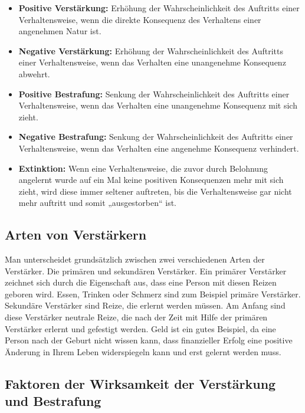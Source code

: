 		\begin{itemize}
			\item \textbf{Positive Verstärkung:} Erhöhung der Wahrscheinlichkeit des Auftritts einer Verhaltensweise, wenn die direkte Konsequenz des Verhaltens einer angenehmen Natur ist. 
			\item \textbf{Negative Verstärkung:} Erhöhung der Wahrscheinlichkeit des Auftritts einer Verhaltensweise, wenn das Verhalten eine unangenehme Konsequenz abwehrt.
			\item \textbf{Positive Bestrafung:} Senkung der Wahrscheinlichkeit des Auftritts einer Verhaltensweise, wenn das Verhalten eine unangenehme Konsequenz mit sich zieht.
			\item \textbf{Negative Bestrafung:} Senkung der Wahrscheinlichkeit des Auftritts einer Verhaltensweise, wenn das Verhalten eine angenehme Konsequenz verhindert. 
			\item \textbf{Extinktion:} Wenn eine Verhaltensweise, die zuvor durch Belohnung angelernt wurde auf ein Mal keine positiven Konsequenzen mehr mit sich zieht, wird diese immer seltener auftreten, bis die Verhaltensweise gar nicht mehr auftritt und somit „ausgestorben“ ist. 
		\end{itemize}
		
		
		\subsection{Arten von Verstärkern}
		
		Man unterscheidet grundsätzlich zwischen zwei verschiedenen Arten der Verstärker. Die primären und sekundären Verstärker. 
Ein primärer Verstärker zeichnet sich durch die Eigenschaft aus, dass eine Person mit diesen Reizen geboren wird. Essen, Trinken oder Schmerz sind zum Beispiel primäre Verstärker. \\
Sekundäre Verstärker sind Reize, die erlernt werden müssen. Am Anfang sind diese Verstärker neutrale Reize, die nach der Zeit mit Hilfe der primären Verstärker erlernt und gefestigt werden. Geld ist ein gutes Beispiel, da eine Person nach der Geburt nicht wissen kann, dass finanzieller Erfolg eine positive Änderung in Ihrem Leben widerspiegeln kann und erst gelernt werden muss. \\

		\subsection{Faktoren der Wirksamkeit der Verstärkung und Bestrafung}
		
